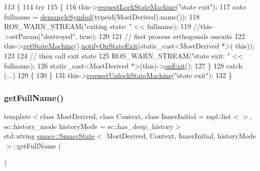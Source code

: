 \begin{DoxyCode}
113   \{
114     \textcolor{keywordflow}{try}
115     \{
116       this->\hyperlink{classsmacc_1_1ISmaccState_ae733140761345e027713bd622d93bf0f}{requestLockStateMachine}(\textcolor{stringliteral}{"state exit"});
117       \textcolor{keyword}{auto} fullname = \hyperlink{namespacesmacc_1_1introspection_a2f495108db3e57604d8d3ff5ef030302}{demangleSymbol}(\textcolor{keyword}{typeid}(MostDerived).name());
118       ROS\_WARN\_STREAM(\textcolor{stringliteral}{"exiting state: "} << fullname);
119       \textcolor{comment}{//this->setParam("destroyed", true);}
120 
121       \textcolor{comment}{// first process orthogonals onexits}
122       this->\hyperlink{classsmacc_1_1SmaccState_afc39f8e0ca4001b2159a100da2fccd0e}{getStateMachine}().\hyperlink{classsmacc_1_1ISmaccStateMachine_a9d2bd4aca0c80a1ec22c5f95e7c38db8}{notifyOnStateExit}(static\_cast<MostDerived *>(\textcolor{keyword}{
      this}));
123 
124       \textcolor{comment}{// then call exit state}
125       ROS\_WARN\_STREAM(\textcolor{stringliteral}{"state exit: "} << fullname);
126       \textcolor{keyword}{static\_cast<}MostDerived *\textcolor{keyword}{>}(\textcolor{keyword}{this})->\hyperlink{classsmacc_1_1SmaccState_a82ca7c69153e86dc5eedf3f909560f3a}{onExit}();
127     \}
128     \textcolor{keywordflow}{catch} (...)
129     \{
130     \}
131     this->\hyperlink{classsmacc_1_1ISmaccState_a3bf006f25d5b9c0534c8e89ae2e93d40}{requestUnlockStateMachine}(\textcolor{stringliteral}{"state exit"});
132   \}
\end{DoxyCode}
\mbox{\label{classsmacc_1_1SmaccState_a897dbdfe52a8b944d4bf1844ddcc3aa5}} 
\subsubsection{\texorpdfstring{get\+Full\+Name()}{getFullName()}}
{\footnotesize\ttfamily template$<$class Most\+Derived, class Context, class Inner\+Initial = mpl\+::list$<$$>$, sc\+::history\+\_\+mode history\+Mode = sc\+::has\+\_\+deep\+\_\+history$>$ \\
std\+::string \hyperlink{classsmacc_1_1SmaccState}{smacc\+::\+Smacc\+State}$<$ Most\+Derived, Context, Inner\+Initial, history\+Mode $>$\+::get\+Full\+Name (\begin{DoxyParamCaption}{ }\end{DoxyParamCaption})\hspace{0.3cm}{\ttfamily [inline]}}



